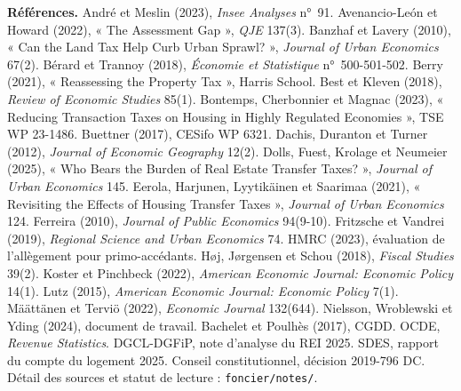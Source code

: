 \documentclass[11pt,a4paper]{article}
\begin{document}
\vspace{6pt}
{\scriptsize\textbf{Références.} André et Meslin (2023), \emph{Insee Analyses} n°~91. Avenancio-León et Howard
(2022), « The Assessment Gap », \emph{QJE} 137(3). Banzhaf et Lavery (2010), « Can the Land Tax Help Curb Urban
Sprawl? », \emph{Journal of Urban Economics} 67(2). Bérard et Trannoy (2018), \emph{Économie et Statistique}
n°~500-501-502. Berry (2021), « Reassessing the Property Tax », Harris School. Best et Kleven (2018),
\emph{Review of Economic Studies} 85(1). Bontemps, Cherbonnier et Magnac (2023), « Reducing Transaction Taxes on
Housing in Highly Regulated Economies », TSE WP 23-1486. Buettner (2017), CESifo WP 6321. Dachis, Duranton et
Turner (2012), \emph{Journal of Economic Geography} 12(2). Dolls, Fuest, Krolage et Neumeier (2025), « Who
Bears the Burden of Real Estate Transfer Taxes? », \emph{Journal of Urban Economics} 145. Eerola, Harjunen, Lyytikäinen et Saarimaa (2021),
« Revisiting the Effects of Housing Transfer Taxes », \emph{Journal of Urban Economics} 124. Ferreira (2010),
\emph{Journal of Public Economics} 94(9-10). Fritzsche et Vandrei (2019), \emph{Regional Science and Urban
Economics} 74. HMRC (2023), évaluation de l'allègement pour primo-accédants. Høj, Jørgensen et Schou (2018),
\emph{Fiscal Studies} 39(2). Koster et Pinchbeck (2022), \emph{American Economic Journal: Economic Policy} 14(1).
Lutz (2015), \emph{American Economic Journal: Economic Policy} 7(1). Määttänen et Terviö (2022), \emph{Economic
Journal} 132(644). Nielsson, Wroblewski et Yding (2024), document de travail. Bachelet et Poulhès (2017), CGDD. OCDE, \emph{Revenue Statistics}. DGCL-DGFiP, note d'analyse du REI 2025. SDES, rapport du compte du
logement 2025. Conseil constitutionnel, décision 2019-796 DC. Détail des sources et statut de lecture :
\texttt{foncier/notes/}.\par}
\end{document}
